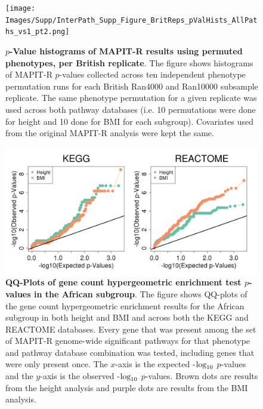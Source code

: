 \documentclass[12pt,a4paper]{article}
\def\log{{\rm log}}
\begin{document}
\setlength{\footskip}{2cm}
\begin{figure}[htbp]
\centering
\vspace*{-1cm}
\texttt{[image: Images/Supp/InterPath\_Supp\_Figure\_BritReps\_pValHists\_AllPaths\_vs1\_pt2.png]}
\caption[TBD]{\textbf{$p$-Value histograms of MAPIT-R results using permuted phenotypes, per British replicate}. The figure shows histograms of MAPIT-R $p$-values collected across ten independent phenotype permutation runs for each British Ran4000 and Ran10000 subsample replicate. The same phenotype permutation for a given replicate was used across both pathway databases (i.e. 10 permutations were done for height and 10 done for BMI for each subgroup). Covariates used from the original MAPIT-R analysis were kept the same.}
\label{InterPath-Supp-Figure-BritReps-10perms-pValHists-pt2}
\end{figure}
\clearpage
\setlength{\footskip}{1cm}

\begin{figure}[htbp]
\centering
\includegraphics[scale=.45]{Images/Supp/InterPath_Supp_Figure_Hypergeometric_QQPlots_African_vs2.png}
\caption[TBD]{\textbf{QQ-Plots of gene count hypergeometric enrichment test $p$-values in the African subgroup}. The figure shows QQ-plots of the gene count hypergeometric enrichment results for the African subgroup in both height and BMI and across both the KEGG and REACTOME databases. Every gene that was present among the set of MAPIT-R genome-wide significant pathways for that phenotype and pathway database combination was tested, including genes that were only present once. The $x$-axis is the expected -$\log_{10}$ $p$-values and the $y$-axis is the observed -$\log_{10}$ $p$-values. Brown dots are results from the height analysis and purple dots are results from the BMI analysis.}
\label{InterPath-Supp-Figure-Hypergeometric-QQPlots-African}
\end{figure}
\clearpage
\end{document}
